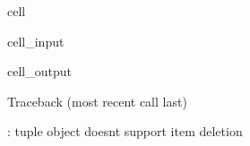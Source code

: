 \documentclass[letterpaper,10pt,english]{jupyterBook}
\begin{document}
\begin{sphinxuseclass}{cell}\begin{sphinxVerbatimInput}

\begin{sphinxuseclass}{cell_input}
\begin{sphinxVerbatim}[commandchars=\\\{\}]
 \PYG{p}{[}\PYG{p}{]}
\end{sphinxVerbatim}

\end{sphinxuseclass}\end{sphinxVerbatimInput}
\begin{sphinxVerbatimOutput}

\begin{sphinxuseclass}{cell_output}
\begin{sphinxVerbatim}[commandchars=\\\{\}]
Traceback (most recent call last)
 \PYG{p}{[}\PYG{p}{]}  
  \PYG{p}{[}\PYG{p}{]}

: \PYGZsq{}tuple\PYGZsq{} object doesn\PYGZsq{}t support item deletion
\end{sphinxVerbatim}

\end{sphinxuseclass}\end{sphinxVerbatimOutput}

\end{sphinxuseclass}
\end{document}
